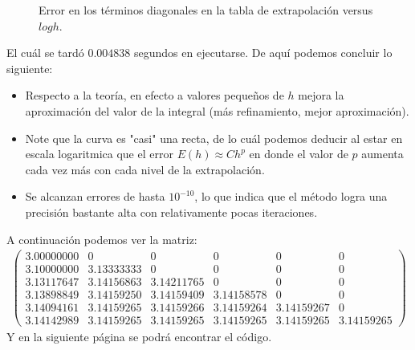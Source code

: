 \begin{homeworkProblem}
\begin{enumerate}
\begin{solucion}
\begin{figure}[H]
\begin{center}
        \end{center}
        \caption{Error en los términos diagonales en la tabla de extrapolación versus $log h$.}
        \end{figure}
        El cuál se tardó $0.004838$ segundos en ejecutarse.
        \newpage
        De aquí podemos concluir lo siguiente:
        \begin{itemize}
          \item Respecto a la teoría, en efecto a valores pequeños de $h$ mejora la aproximación del valor de la integral (más refinamiento, mejor aproximación).
          \item Note que la curva es "casi" una recta, de lo cuál podemos deducir al estar en escala logaritmica que el error $E(h)\approx Ch^{p}$ en donde el valor de $p$ aumenta cada vez más con cada nivel de la extrapolación.
          \item Se alcanzan errores de hasta $10^{-10}$, lo que indica que el método logra una precisión bastante alta con relativamente pocas iteraciones.
        \end{itemize}
        A continuación podemos ver la matriz:
        \begin{align*}
          \begin{pmatrix}
            3.00000000 & 0 & 0 & 0 & 0 & 0\\
            3.10000000 & 3.13333333 & 0 & 0 & 0 & 0\\
            3.13117647 & 3.14156863 & 3.14211765 & 0 & 0 & 0\\
            3.13898849 & 3.14159250 & 3.14159409 & 3.14158578 & 0 & 0\\
            3.14094161 & 3.14159265 & 3.14159266 & 3.14159264 & 3.14159267 & 0\\
          3.14142989 & 3.14159265 & 3.14159265 & 3.14159265 & 3.14159265 & 3.14159265
          \end{pmatrix}
        \end{align*}
        Y en la siguiente página se podrá encontrar el código.
        \newpage
        
      \end{solucion}
  \end{enumerate}
\end{homeworkProblem}
